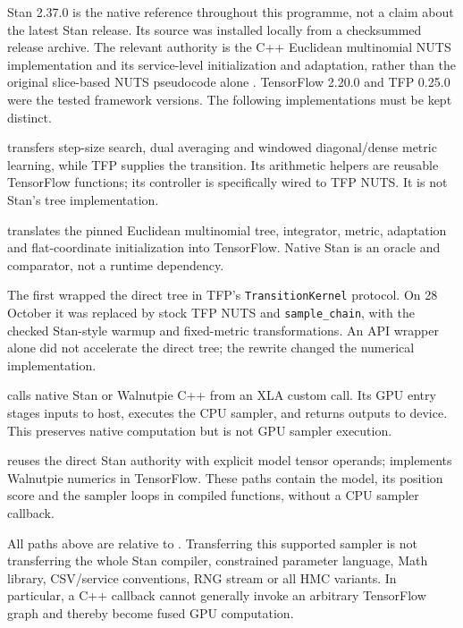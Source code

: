 Stan 2.37.0 is the native reference throughout this programme, not a claim
about the latest Stan release. Its source was installed locally from a
checksummed release archive. The relevant authority is the C++ Euclidean
multinomial NUTS implementation and its service-level initialization and
adaptation, rather than the original slice-based NUTS pseudocode alone
\citep{swStan237,swNUTS2014}. TensorFlow 2.20.0 and TFP 0.25.0 were the
tested framework versions. The following implementations must be kept distinct.

\begin{description}[style=nextline]
\item[Stan-style warmup around TFP NUTS.]
 transfers step-size search, dual averaging and
windowed diagonal/dense metric learning, while TFP supplies the transition.
Its arithmetic helpers are reusable TensorFlow functions; its controller
is specifically wired to TFP NUTS. It is not Stan's tree implementation.
\item[Direct Stan algorithm port.]
 translates the pinned Euclidean multinomial tree,
integrator, metric, adaptation and flat-coordinate initialization into
TensorFlow. Native Stan is an oracle and comparator, not a runtime dependency.
\item[Native TFP interface.]
The first  wrapped the direct tree in TFP's
\texttt{TransitionKernel} protocol. On 28 October it was replaced by stock
TFP NUTS and \texttt{sample\_chain}, with the checked Stan-style warmup and
fixed-metric transformations. An API wrapper alone did not accelerate the
direct tree; the rewrite changed the numerical implementation.
\item[Native C++ XLA bridge.]
 calls native Stan or Walnutpie C++ from an
XLA custom call. Its GPU entry stages inputs to host, executes the CPU
sampler, and returns outputs to device. This preserves native computation
but is not GPU sampler execution.
\item[TensorFlow models inside GPU/XLA samplers.]
 reuses the direct Stan authority with explicit model
tensor operands;  implements Walnutpie numerics
in TensorFlow. These paths contain the model, its position score and the
sampler loops in compiled functions, without a CPU sampler callback.
\end{description}

All paths above are relative to . Transferring this
supported sampler is not transferring the whole Stan compiler, constrained
parameter language, Math library, CSV/service conventions, RNG stream or
all HMC variants. In particular, a C++ callback cannot generally invoke an
arbitrary TensorFlow graph and thereby become fused GPU computation.

